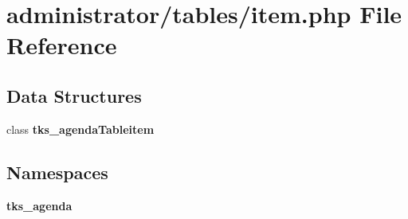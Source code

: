 \section{administrator/tables/item.php File Reference}
\label{administrator_2tables_2item_8php}
\subsection*{Data Structures}
\begin{DoxyCompactItemize}
\item 
class \textbf{ tks\+\_\+agenda\+Tableitem}
\end{DoxyCompactItemize}
\subsection*{Namespaces}
\begin{DoxyCompactItemize}
\item 
 \textbf{ tks\+\_\+agenda}
\end{DoxyCompactItemize}

